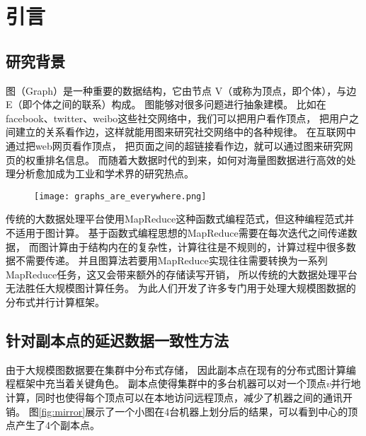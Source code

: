 \chapter{引言}
\section{研究背景}

图（Graph）是一种重要的数据结构，它由节点 V（或称为顶点，即个体），与边 E（即个体之间的联系）构成。
图能够对很多问题进行抽象建模。
比如在facebook、twitter、weibo这些社交网络中，我们可以把用户看作顶点，
把用户之间建立的关系看作边，这样就能用图来研究社交网络中的各种规律。
在互联网中通过把web网页看作顶点，
把页面之间的超链接看作边，就可以通过图来研究网页的权重排名信息。
而随着大数据时代的到来，如何对海量图数据进行高效的处理分析愈加成为工业和学术界的研究热点。

\begin{figure}[!htbp]
  \centering
  \texttt{[image: graphs\_are\_everywhere.png]}
\end{figure}

传统的大数据处理平台使用MapReduce\cite{mapreduce}这种函数式编程范式，但这种编程范式并不适用于图计算。
基于函数式编程思想的MapReduce需要在每次迭代之间传递数据，
而图计算由于结构内在的复杂性，计算往往是不规则的，计算过程中很多数据不需要传递。
并且图算法若要用MapReduce实现往往需要转换为一系列MapReduce任务，这又会带来额外的存储读写开销，
所以传统的大数据处理平台无法胜任大规模图计算任务\cite{Malewicz@SIGMOD10}。
为此人们开发了许多专门用于处理大规模图数据的分布式并行计算框架。    
\cite{Malewicz@SIGMOD10, Low@12, Gonzalez@OSDI12, Zhu@OSDI16, Gonzalez@OSDI14, Avery@HS11, Shao@SIGMOD13, 
Chen@EuroSys15, Xie@PPoPP15, Roy@SOSP15, Seo@CloudCom10, Gregor@POOSC15, Hoque@TRIOS13, Teixeira@SOSP15}

\section{针对副本点的延迟数据一致性方法}

由于大规模图数据要在集群中分布式存储， 因此副本点在现有的分布式图计算编程框架中充当着关键角色。
副本点使得集群中的多台机器可以对一个顶点$v$并行地计算，同时也使得每个顶点可以在本地访问远程顶点，减少了机器之间的通讯开销。 
图\ref{fig:mirror}展示了一个小图在4台机器上划分后的结果，可以看到中心的顶点产生了4个副本点。

